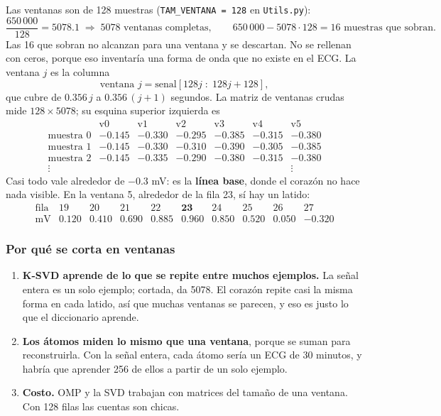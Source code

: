 \documentclass[11pt,letterpaper]{article}
\begin{document}
Las ventanas son de 128 muestras (\texttt{TAM\_VENTANA = 128} en
\texttt{Utils.py}):
\[
    \frac{650\,000}{128} = 5078.1
    \;\Rightarrow\; 5078 \text{ ventanas completas},
    \qquad
    650\,000 - 5078 \cdot 128 = 16 \text{ muestras que sobran.}
\]
Las 16 que sobran no alcanzan para una ventana y se descartan. No se
rellenan con ceros, porque eso inventaría una forma de onda que no
existe en el ECG. La ventana $j$ es la columna
\[
    \text{ventana } j = \text{senal}[128j \;:\; 128j + 128],
\]
que cubre de $0.356\,j$ a $0.356\,(j+1)$ segundos. La matriz de ventanas
crudas mide $128 \times 5078$; su esquina superior izquierda es
\[
    \begin{array}{r|rrrrrr}
        & \text{v}0 & \text{v}1 & \text{v}2 & \text{v}3 & \text{v}4
        & \text{v}5 \\
        \hline
        \text{muestra } 0 & -0.145 & -0.330 & -0.295 & -0.385
                          & -0.315 & -0.380 \\
        \text{muestra } 1 & -0.145 & -0.330 & -0.310 & -0.390
                          & -0.305 & -0.385 \\
        \text{muestra } 2 & -0.145 & -0.335 & -0.290 & -0.380
                          & -0.315 & -0.380 \\
        \vdots & & & & & & \vdots
    \end{array}
\]
Casi todo vale alrededor de $-0.3$ mV: es la \textbf{línea base}, donde
el corazón no hace nada visible. En la ventana 5, alrededor de la fila
23, sí hay un latido:
\[
    \begin{array}{c|ccccccccc}
        \text{fila} & 19 & 20 & 21 & 22 & \mathbf{23} & 24 & 25 & 26
                    & 27 \\
        \hline
        \text{mV} & 0.120 & 0.410 & 0.690 & 0.885 & \mathbf{0.960}
                  & 0.850 & 0.520 & 0.050 & -0.320
    \end{array}
\]

\subsubsection*{Por qué se corta en ventanas}

\begin{enumerate}[itemsep=0.3em]
    \item \textbf{K-SVD aprende de lo que se repite entre muchos
          ejemplos.} La señal entera es un solo ejemplo; cortada, da
          5078. El corazón repite casi la misma forma en cada latido,
          así que muchas ventanas se parecen, y eso es justo lo que el
          diccionario aprende.
    \item \textbf{Los átomos miden lo mismo que una ventana}, porque se
          suman para reconstruirla. Con la señal entera, cada átomo
          sería un ECG de 30 minutos, y habría que aprender 256 de ellos
          a partir de un solo ejemplo.
    \item \textbf{Costo.} OMP y la SVD trabajan con matrices del tamaño
          de una ventana. Con 128 filas las cuentas son chicas.
\end{enumerate}
\end{document}

